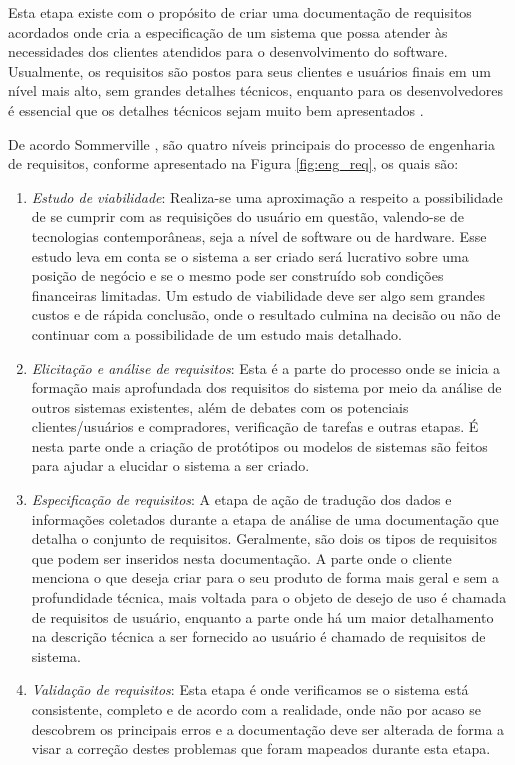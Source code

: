 Esta etapa existe com o propósito de criar uma documentação de requisitos acordados onde cria a especificação de um sistema que possa atender às necessidades dos clientes atendidos para o desenvolvimento do software. Usualmente, os requisitos são postos para seus clientes e usuários finais em um nível mais alto, sem grandes detalhes técnicos, enquanto para os desenvolvedores é essencial que os detalhes técnicos sejam muito bem apresentados \cite{Sommerville07}.

De acordo Sommerville \cite{Sommerville07}, são quatro níveis principais do processo de engenharia de requisitos, conforme apresentado na Figura \ref{fig:eng_req}, os quais são:

\begin{enumerate}
    \item \textit{Estudo de viabilidade}: Realiza-se uma aproximação a respeito a possibilidade de se cumprir com as requisições do usuário em questão, valendo-se de tecnologias contemporâneas, seja a nível de software ou de hardware. Esse estudo leva em conta se o sistema a ser criado será lucrativo sobre uma posição de negócio e se o mesmo pode ser construído sob condições financeiras limitadas. Um estudo de viabilidade deve ser algo sem grandes custos e de rápida conclusão, onde o resultado culmina na decisão ou não de continuar com a possibilidade de um estudo mais detalhado.
    
    \item \textit{Elicitação e análise de requisitos}: Esta é a parte do processo onde se inicia a formação mais aprofundada dos requisitos do sistema por meio da análise de outros sistemas existentes, além de debates com os potenciais clientes/usuários e compradores, verificação de tarefas e outras etapas. É nesta parte onde a criação de protótipos ou modelos de sistemas são feitos para ajudar a elucidar o sistema a ser criado.
    
    \item \textit{Especificação de requisitos}: A etapa de ação de tradução dos dados e informações coletados durante a etapa de análise de uma documentação que detalha o conjunto de requisitos. Geralmente, são dois os tipos de requisitos que podem ser inseridos nesta documentação. A parte onde o cliente menciona o que deseja criar para o seu produto de forma mais geral e sem a profundidade técnica, mais voltada para o objeto de desejo de uso é chamada de requisitos de usuário, enquanto a parte onde há um maior detalhamento na descrição técnica a ser fornecido ao usuário é chamado de requisitos de sistema.
    
    \item \textit{Validação de requisitos}: Esta etapa é onde verificamos se o sistema está consistente, completo e de acordo com a realidade, onde não por acaso se descobrem os principais erros e a documentação deve ser alterada de forma a visar a correção destes problemas que foram mapeados durante esta etapa.
\end{enumerate}

